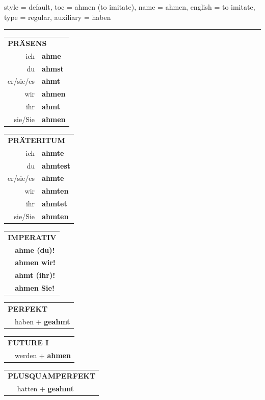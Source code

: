 \begin{verbentry}{
  style = {default},
  toc = {ahmen (to imitate)},
  name = {ahmen},
  english = {to imitate},
  type = {regular},
  auxiliary = {haben}
}


\vspace{5pt}
\hrule
\vspace{5pt}

\begin{tabular}{rl}
\multicolumn{2}{l}{\textbf{PRÄSENS}}\\
ich & \textbf{ahme}\\
du & \textbf{ahmst}\\
er/sie/es & \textbf{ahmt}\\
wir & \textbf{ahmen}\\
ihr & \textbf{ahmt}\\
sie/Sie & \textbf{ahmen}\\
\end{tabular}
\hfill
\begin{tabular}{rl}
\multicolumn{2}{l}{\textbf{PRÄTERITUM}}\\
ich & \textbf{ahmte}\\
du & \textbf{ahmtest}\\
er/sie/es & \textbf{ahmte}\\
wir & \textbf{ahmten}\\
ihr & \textbf{ahmtet}\\
sie/Sie & \textbf{ahmten}\\
\end{tabular}
\hfill
\begin{tabular}{rl}
\multicolumn{2}{l}{\textbf{IMPERATIV}}\\
& \textbf{ahme (du)!}\\
& \textbf{ahmen wir!}\\
& \textbf{ahmt (ihr)!}\\
& \textbf{ahmen Sie!}\\
\end{tabular}

\vspace{10pt}

\begin{tabular}{rl}
\multicolumn{2}{l}{\textbf{PERFEKT}}\\
& haben + \textbf{geahmt}\\
\end{tabular}
\hfill
\begin{tabular}{rl}
\multicolumn{2}{l}{\textbf{FUTURE I}}\\
& werden + \textbf{ahmen}\\
\end{tabular}
\hfill
\begin{tabular}{rl}
\multicolumn{2}{l}{\textbf{PLUSQUAMPERFEKT}}\\
& hatten + \textbf{geahmt}\\
\end{tabular}


\end{verbentry}
